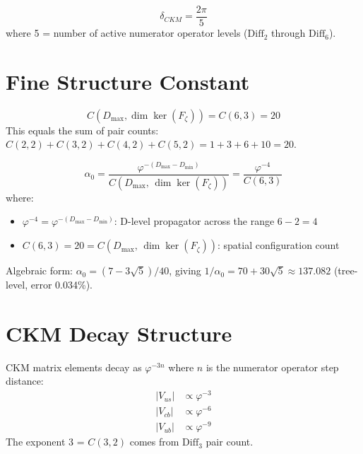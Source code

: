 \begin{theorem}[CP Phase]
\label{thm:coupling_cp_phase}
\leanok
\[
\delta_{CKM} = \frac{2\pi}{5}
\]
where 5 = number of active numerator operator levels ($\mathrm{Diff}_2$ through $\mathrm{Diff}_6$).
\end{theorem}

\section{Fine Structure Constant}
\label{sec:coupling_fine_structure}

\begin{theorem}
\label{thm:coupling_spatial_norm}
\leanok
\[
C(D_{\max}, \dim\ker(F_\zeta)) = C(6,3) = 20
\]
This equals the sum of pair counts: $C(2,2)+C(3,2)+C(4,2)+C(5,2) = 1+3+6+10 = 20$.
\end{theorem}

\begin{theorem}
\label{thm:coupling_fine_structure}
\leanok
\[
\alpha_0 = \frac{\varphi^{-(D_{\max}-D_{\min})}}{C(D_{\max},\,\dim\ker(F_\zeta))} = \frac{\varphi^{-4}}{C(6,3)}
\]
where:
\begin{itemize}
\item $\varphi^{-4} = \varphi^{-(D_{\max}-D_{\min})}$: D-level propagator across the range $6-2=4$
\item $C(6,3) = 20 = C(D_{\max},\,\dim\ker(F_\zeta))$: spatial configuration count
\end{itemize}
Algebraic form: $\alpha_0 = (7-3\sqrt{5})/40$, giving $1/\alpha_0 = 70+30\sqrt{5} \approx 137.082$ (tree-level, error 0.034\%).
\end{theorem}

\section{CKM Decay Structure}
\label{sec:coupling_ckm}

\begin{theorem}
\label{thm:coupling_ckm_decay}
\leanok
CKM matrix elements decay as $\varphi^{-3n}$ where $n$ is the numerator operator step distance:
\begin{align}
|V_{us}| &\propto \varphi^{-3} \\
|V_{cb}| &\propto \varphi^{-6} \\
|V_{ub}| &\propto \varphi^{-9}
\end{align}
The exponent 3 = $C(3,2)$ comes from $\mathrm{Diff}_3$ pair count.
\end{theorem}

